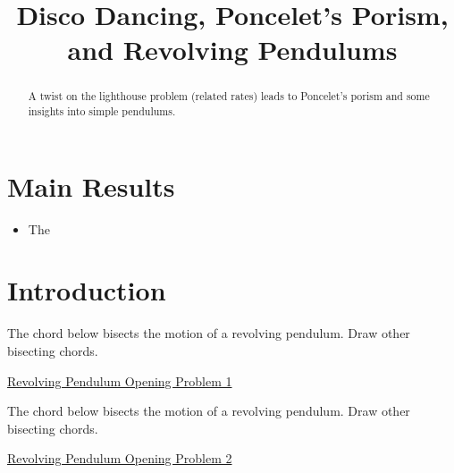 \documentclass{ximera}
\title{Disco Dancing, Poncelet's Porism, and Revolving Pendulums}
\begin{document}
\begin{abstract}
A twist on the lighthouse problem (related rates) leads to Poncelet's porism and some insights into simple pendulums.
\end{abstract}
\maketitle

\section*{Main Results}

\begin{itemize}

\item{The}

\end{itemize}


\section{Introduction}

\begin{exploration}
The chord below bisects the motion of a revolving pendulum. Draw other bisecting chords.

\begin{onlineOnly}
    \begin{center}
\end{center}
\end{onlineOnly}

\href{https://www.desmos.com/calculator/zlyigzhmpn}{Revolving Pendulum Opening Problem 1}

\end{exploration}

\begin{exploration}
The chord below bisects the motion of a revolving pendulum. Draw other bisecting chords.

\begin{onlineOnly}
    \begin{center}
\end{center}
\end{onlineOnly}

\href{https://www.desmos.com/calculator/hqajtdhr31}{Revolving Pendulum Opening Problem 2}

\end{exploration}
\end{document}
